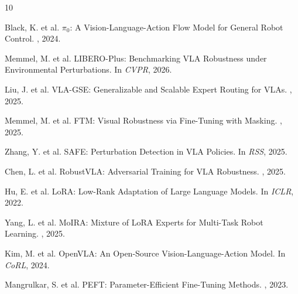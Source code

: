 \documentclass[letterpaper]{article}
\begin{document}

\begin{thebibliography}{10}

Black, K. et al.
\newblock $\pi_0$: A Vision-Language-Action Flow Model for General Robot Control.
, 2024.

Memmel, M. et al.
\newblock LIBERO-Plus: Benchmarking VLA Robustness under Environmental Perturbations.
\newblock In {\em CVPR}, 2026.

Liu, J. et al.
\newblock VLA-GSE: Generalizable and Scalable Expert Routing for VLAs.
, 2025.

Memmel, M. et al.
\newblock FTM: Visual Robustness via Fine-Tuning with Masking.
, 2025.

Zhang, Y. et al.
\newblock SAFE: Perturbation Detection in VLA Policies.
\newblock In {\em RSS}, 2025.

Chen, L. et al.
\newblock RobustVLA: Adversarial Training for VLA Robustness.
, 2025.

Hu, E. et al.
\newblock LoRA: Low-Rank Adaptation of Large Language Models.
\newblock In {\em ICLR}, 2022.

Yang, L. et al.
\newblock MoIRA: Mixture of LoRA Experts for Multi-Task Robot Learning.
, 2025.

Kim, M. et al.
\newblock OpenVLA: An Open-Source Vision-Language-Action Model.
\newblock In {\em CoRL}, 2024.

Mangrulkar, S. et al.
\newblock PEFT: Parameter-Efficient Fine-Tuning Methods.
, 2023.

\end{thebibliography}
\end{document}
